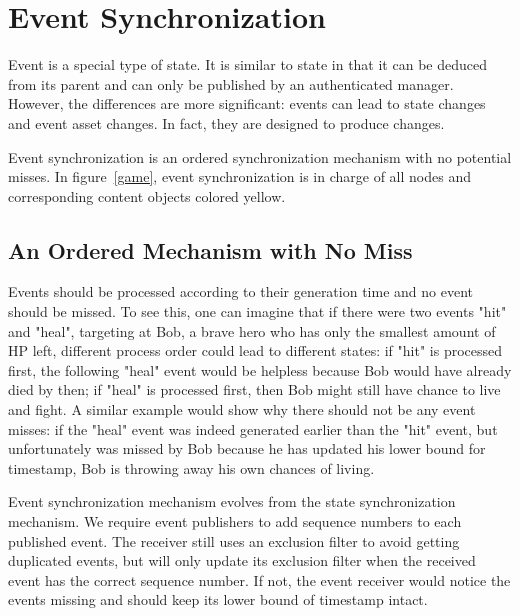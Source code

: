 \section{Event Synchronization}
\label{eventsync}
Event is a special type of state. It is similar to state in that it can be deduced from its parent and can only be published by an authenticated manager. %
However, the differences are more significant: events can lead to state changes and event asset changes. In fact, they are designed to produce changes.

Event synchronization is an ordered synchronization mechanism with no potential misses. In figure~\ref{game}, event synchronization is in charge of all nodes and corresponding content objects colored yellow.


\subsection{An Ordered Mechanism with No Miss}
Events should be processed according to their generation time and no event should be missed. To see this, one can imagine that if there were two events "{hit}" and "{heal}", targeting at Bob, a brave hero who has only the smallest amount of HP left, different process order could lead to different states: if "{hit}" is processed first, the following "{heal}" event would be helpless because Bob would have already died by then; if "{heal}" is processed first, then Bob might still have chance to live and fight. A similar example would show why there should not be any event misses: if the "{heal}" event was indeed generated earlier than the "{hit}" event, but unfortunately was missed by Bob because he has updated his lower bound for timestamp, Bob is throwing away his own chances of living.


Event synchronization mechanism evolves from the state synchronization mechanism. We require event publishers to add sequence numbers to each published event. The receiver still uses an exclusion filter to avoid getting duplicated events, but will only update its exclusion filter when the received event has the correct sequence number. If not, the event receiver would notice the events missing and should keep its lower bound of timestamp intact.

